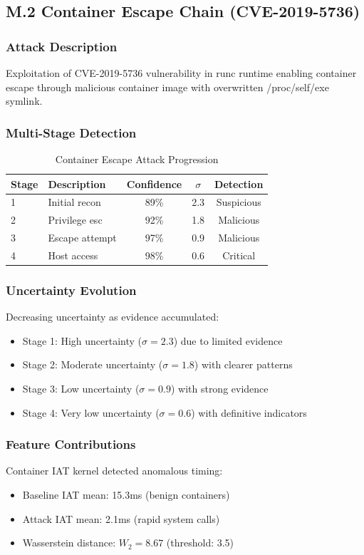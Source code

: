 \documentclass[12pt]{article}
\begin{document}
\subsection{M.2 Container Escape Chain (CVE-2019-5736)}

\subsubsection{Attack Description}
Exploitation of CVE-2019-5736 vulnerability in runc runtime enabling container escape through malicious container image with overwritten /proc/self/exe symlink.

\subsubsection{Multi-Stage Detection}
\begin{table}[H]
\centering
\caption{Container Escape Attack Progression}
\begin{tabular}{llccc}
\toprule
\textbf{Stage} & \textbf{Description} & \textbf{Confidence} & \textbf{$\sigma$} & \textbf{Detection} \\
\midrule
1 & Initial recon & 89\% & 2.3 & Suspicious \\
2 & Privilege esc & 92\% & 1.8 & Malicious \\
3 & Escape attempt & 97\% & 0.9 & Malicious \\
4 & Host access & 98\% & 0.6 & Critical \\
\bottomrule
\end{tabular}
\end{table}

\subsubsection{Uncertainty Evolution}
Decreasing uncertainty as evidence accumulated:
\begin{itemize}
\item Stage 1: High uncertainty ($\sigma=2.3$) due to limited evidence
\item Stage 2: Moderate uncertainty ($\sigma=1.8$) with clearer patterns
\item Stage 3: Low uncertainty ($\sigma=0.9$) with strong evidence
\item Stage 4: Very low uncertainty ($\sigma=0.6$) with definitive indicators
\end{itemize}

\subsubsection{Feature Contributions}
Container IAT kernel detected anomalous timing:
\begin{itemize}
\item Baseline IAT mean: 15.3ms (benign containers)
\item Attack IAT mean: 2.1ms (rapid system calls)
\item Wasserstein distance: $W_2 = 8.67$ (threshold: 3.5)
\end{itemize}
\end{document}

